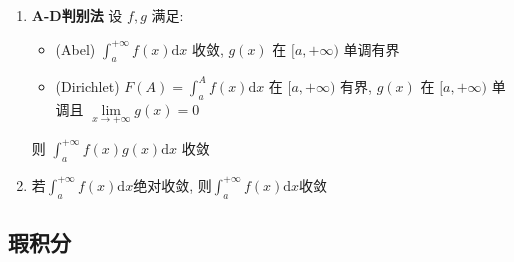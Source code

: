 \documentclass{article}
\begin{document}
\begin{enumerate}
\begin{itemize}
				\end{itemize}
				\item \textbf{A-D判别法} 设 $f, g$ 满足:
				\begin{itemize}
				\item (Abel) $\int_{a}^{+\infty} f(x) \mathrm{d} x$ 收敛, $g(x)$ 在 $[a, +\infty)$ 单调有界
				\item (Dirichlet) $F(A)=\int_{a}^{A} f(x) \mathrm{d} x$ 在 $[a, +\infty)$ 有界, $g(x)$ 在 $[a, +\infty)$ 单调且 $\underset{x \rightarrow+\infty}{\lim} g(x)=0$
				\end{itemize}
				则 $\int_{a}^{+\infty} f(x) g(x) \mathrm{d} x$ 收敛
				\item 若$\int_{a}^{+\infty} f(x) \mathrm{d} x$绝对收敛, 则$\int_{a}^{+\infty} f(x) \mathrm{d} x$收敛
			\end{enumerate}
		\subsection{瑕积分}
\end{document}
